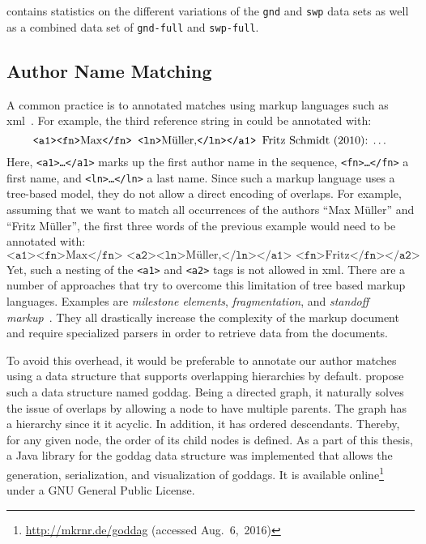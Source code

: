  contains statistics on the different variations of the \texttt{gnd} and \texttt{swp} data sets as well as a combined data set of \texttt{gnd-full} and \texttt{swp-full}.

\subsection{Author Name Matching}\label{subsec:i-author-name-matching}
A common practice is to annotated matches using markup languages such as \gls{xml}~\citep[e.g.][]{mccallum2000automating,councill2008parscit}.
For example, the third reference string in  could be annotated with:
\begin{equation*}
  \texttt{<a1><fn>}\text{Max}\texttt{</fn> <ln>}\text{M\"{u}ller,}\texttt{</ln></a1> }\text{Fritz Schmidt (2010): \dots}
\end{equation*}
Here, \texttt{<a1>\dots</a1>} marks up the first author name in the sequence, \texttt{<fn>\dots</fn>} a first name, and \texttt{<ln>\dots</ln>} a last name.
Since such a markup language uses a tree-based model, they do not allow a direct encoding of overlaps.
For example, assuming that we want to match all occurrences of the authors ``Max M\"{u}ller'' and ``Fritz M\"{u}ller'', the first three words of the previous example would need to be annotated with:
\begin{equation*}
  \texttt{<a1><fn>}\text{Max}\texttt{</fn> <a2><ln>}\text{M\"{u}ller,}\texttt{</ln></a1> <fn>}\text{Fritz}\texttt{</fn></a2>}
\end{equation*}
Yet, such a nesting of the \texttt{<a1>} and \texttt{<a2>} tags is not allowed in \gls{xml}.
There are a number of approaches that try to overcome this limitation of tree based markup languages.
Examples are \textit{milestone elements}, \textit{fragmentation}, and \textit{standoff markup}~\citep{sperberg2000goddag}.
They all drastically increase the complexity of the markup document and require specialized parsers in order to retrieve data from the documents.

To avoid this overhead, it would be preferable to annotate our author matches using a data structure that supports overlapping hierarchies by default.
\citet{sperberg2000goddag} propose such a data structure named \acrfull{goddag}.
Being a directed graph, it naturally solves the issue of overlaps by allowing a node to have multiple parents.
The graph has a hierarchy since it it acyclic.
In addition, it has ordered descendants.
Thereby, for any given node, the order of its child nodes is defined.
As a part of this thesis, a Java library for the \gls{goddag} data structure was implemented that allows the generation, serialization, and visualization of \glspl{goddag}.
It is available online\footnote{\url{http://mkrnr.de/goddag} (accessed Aug.~6,~2016)} under a GNU General Public License.

